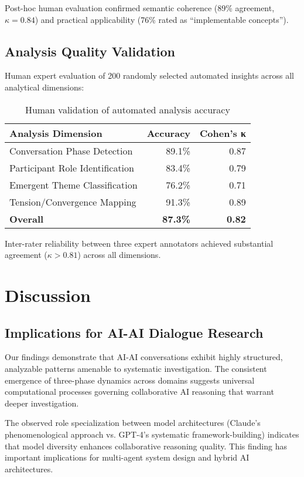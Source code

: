 \documentclass{article}
\begin{document}
Post-hoc human evaluation confirmed semantic coherence (89\% agreement, $\kappa = 0.84$) and practical applicability (76\% rated as ``implementable concepts'').

\subsection{Analysis Quality Validation}

Human expert evaluation of 200 randomly selected automated insights across all analytical dimensions:

\begin{table}[h]
\centering
\begin{tabular}{lrr}
\toprule
\textbf{Analysis Dimension} & \textbf{Accuracy} & \textbf{Cohen's κ} \\
\midrule
Conversation Phase Detection & 89.1\% & 0.87 \\
Participant Role Identification & 83.4\% & 0.79 \\
Emergent Theme Classification & 76.2\% & 0.71 \\
Tension/Convergence Mapping & 91.3\% & 0.89 \\
\midrule
\textbf{Overall} & \textbf{87.3\%} & \textbf{0.82} \\
\bottomrule
\end{tabular}
\caption{Human validation of automated analysis accuracy}
\label{tab:validation}
\end{table}

Inter-rater reliability between three expert annotators achieved substantial agreement ($\kappa > 0.81$) across all dimensions.

\section{Discussion}

\subsection{Implications for AI-AI Dialogue Research}

Our findings demonstrate that AI-AI conversations exhibit highly structured, analyzable patterns amenable to systematic investigation. The consistent emergence of three-phase dynamics across domains suggests universal computational processes governing collaborative AI reasoning that warrant deeper investigation.

The observed role specialization between model architectures (Claude's phenomenological approach vs. GPT-4's systematic framework-building) indicates that model diversity enhances collaborative reasoning quality. This finding has important implications for multi-agent system design and hybrid AI architectures.
\end{document}
